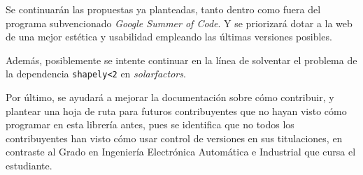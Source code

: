 Se continuarán las propuestas ya planteadas, tanto dentro como fuera del programa subvencionado \textit{Google Summer of Code}. Y se priorizará dotar a la web de una mejor estética y usabilidad empleando las últimas versiones posibles.

Además, posiblemente se intente continuar en la línea de solventar el problema de la dependencia \texttt{shapely<2} en \textit{solarfactors}.

Por último, se ayudará a mejorar la documentación sobre cómo contribuir, y plantear una hoja de ruta para futuros contribuyentes que no hayan visto cómo programar en esta librería antes, pues se identifica que no todos los contribuyentes han visto cómo usar control de versiones en sus titulaciones, en contraste al Grado en Ingeniería Electrónica Automática e Industrial que cursa el estudiante.
